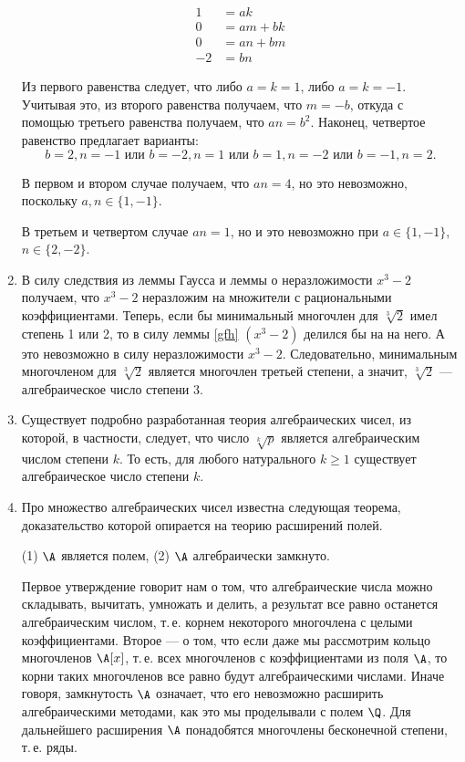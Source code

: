 \begin{enumerate}
\begin{align*}
1 & = ak \\
0 & = am+bk \\
0 & = an+bm \\
-2 & = bn
\end{align*}

Из первого равенства следует, что либо $a=k=1$, либо $a=k=-1$. Учитывая это, из второго равенства получаем, что $m=-b$, откуда с помощью третьего равенства получаем, что $an=b^2$. Наконец, четвертое равенство предлагает варианты:
$$
b=2,n=-1\mbox{ или }b=-2,n=1\mbox{ или }b=1,n=-2\mbox{ или }b=-1,n=2.
$$

В первом и втором случае получаем, что $an=4$, но это невозможно, поскольку $a,n\in\{1,-1\}$.

В третьем и четвертом случае $an=1$, но и это невозможно при $a\in\{1,-1\}$, $n\in\{2,-2\}$.
\epf

\item В силу следствия из леммы Гаусса и леммы о неразложимости $x^3-2$ получаем, что $x^3-2$ неразложим на множители с рациональными коэффициентами. Теперь, если бы минимальный многочлен для $\sqrt[3]{2}$ имел степень 1 или 2, то в силу леммы \ref{gfh} $(x^3-2)$ делился бы на на него. А это невозможно в силу неразложимости $x^3-2$. Следовательно, минимальным многочленом для $\sqrt[3]{2}$ является многочлен третьей степени, а значит, $\sqrt[3]{2}$ --- алгебраическое число степени 3.
\item Существует подробно разработанная теория алгебраических чисел, из которой, в частности, следует, что число $\sqrt[k]{p}$ является алгебраическим числом степени $k$. То есть, для любого натурального $k\ge 1$ существует алгебраическое число степени $k$.




\item Про множество алгебраических чисел известна следующая теорема, доказательство которой опирается на теорию расширений полей.
\begin{thrm}
\textup{(1)} $\A$ является полем, \textup{(2)} $\A$ алгебраически замкнуто.
\end{thrm}
Первое утверждение говорит нам о том, что алгебраические числа можно складывать, вычитать, умножать и делить, а результат все равно останется алгебраическим числом, т.\,е. корнем некоторого многочлена с целыми коэффициентами. Второе --- о том, что если даже мы рассмотрим кольцо многочленов $\A[x]$, т.\,е. всех многочленов с коэффициентами из поля $\A$, то корни таких многочленов все равно будут алгебраическими числами. Иначе говоря, замкнутость $\A$ означает, что его невозможно расширить алгебраическими методами, как это мы проделывали с полем $\Q$. Для дальнейшего расширения $\A$ понадобятся многочлены бесконечной степени, т.\,е. ряды.


\end{enumerate}
